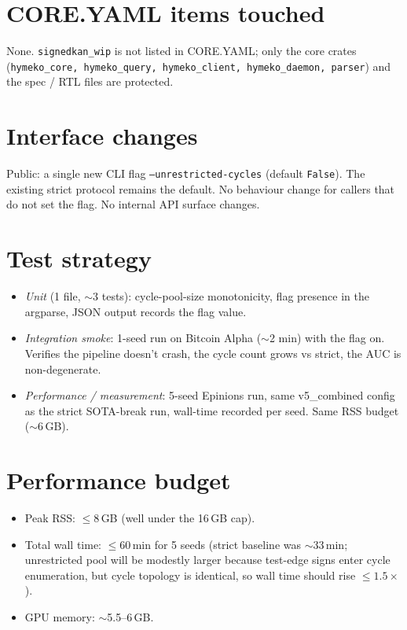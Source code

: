 \documentclass[11pt,a4paper]{article}
\begin{document}
\section{CORE.YAML items touched}

None. \texttt{signedkan\_wip} is not listed in CORE.YAML; only the
core crates (\texttt{hymeko\_core, hymeko\_query, hymeko\_client,
hymeko\_daemon, parser}) and the spec / RTL files are protected.

\section{Interface changes}

Public: a single new CLI flag
\texttt{--unrestricted-cycles} (default \texttt{False}). The
existing strict protocol remains the default. No behaviour change
for callers that do not set the flag. No internal API surface
changes.

\section{Test strategy}

\begin{itemize}
\item \emph{Unit} (1 file, $\sim$3 tests):
  cycle-pool-size monotonicity, flag presence in the argparse, JSON
  output records the flag value.
\item \emph{Integration smoke}: 1-seed run on Bitcoin Alpha
  ($\sim$2 min) with the flag on. Verifies the pipeline doesn't
  crash, the cycle count grows vs strict, the AUC is non-degenerate.
\item \emph{Performance / measurement}: 5-seed Epinions run, same
  v5\_combined config as the strict SOTA-break run, wall-time
  recorded per seed. Same RSS budget ($\sim$6\,GB).
\end{itemize}

\section{Performance budget}

\begin{itemize}
\item Peak RSS: $\leq 8$\,GB (well under the 16\,GB cap).
\item Total wall time: $\leq 60$\,min for 5 seeds
  (strict baseline was $\sim$33\,min; unrestricted pool will be
  modestly larger because test-edge signs enter cycle enumeration,
  but cycle topology is identical, so wall time should rise
  $\leq 1.5\times$).
\item GPU memory: $\sim$5.5--6\,GB.
\end{itemize}
\end{document}
